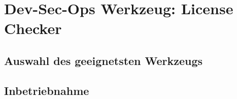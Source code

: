 \chapter{Dev-Sec-Ops Werkzeug: License Checker}

\section{Auswahl des geeignetsten Werkzeugs}
\section{Inbetriebnahme}
